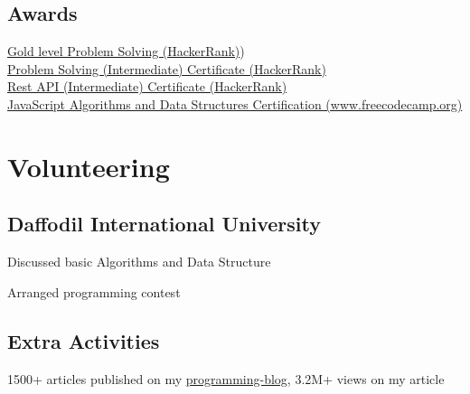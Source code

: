 \documentclass[]{deedy-resume-openfont}
\begin{document}
\begin{minipage}[t]{0.34\textwidth}

\subsection{Awards} 
\textbullet{} \href{https://www.hackerrank.com/jinnatul}{Gold level Problem Solving (HackerRank)}) \\
\textbullet{} \href{https://www.hackerrank.com/certificates/be6cd61c8041}{Problem Solving (Intermediate) Certificate (HackerRank)} \\
\textbullet{} \href{https://www.hackerrank.com/certificates/1f0ca747169a}{Rest API (Intermediate) Certificate (HackerRank)} \\
\textbullet{} \href{https://www.freecodecamp.org/certification/jinnatul/javascript-algorithms-and-data-structures}{JavaScript Algorithms and Data Structures Certification (www.freecodecamp.org)} \\
\sectionsep


\section{Volunteering}
\subsection{Daffodil International University}
\vspace{\topsep}
\begin{tightemize}
\item Discussed basic Algorithms and Data Structure
\item Arranged programming contest
\end{tightemize}
\sectionsep

\subsection{Extra Activities}
1500+ articles published on my \href{http://programming-jinnatul.blogspot.com/}{programming-blog}, 3.2M+ views on my article
\sectionsep

%
%

\end{minipage} 
\end{document}
